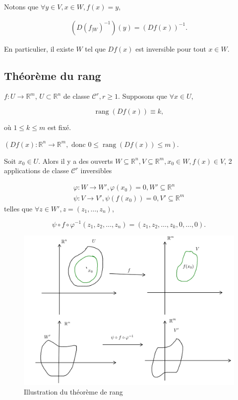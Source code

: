\documentclass[french]{article}
\begin{document}
Notons que $\forall y \in V, x \in W, f(x)=y$,

\begin{gather*}
  (D(f _{|W})^{-1} )(y) = (Df(x)) ^{-1}.
\end{gather*}

En particulier, il existe $W$ tel que $Df(x)$ est inversible pour tout $x \in W$.

\subsection{Théorème du rang}



\begin{thm}[Du rang]
  $f : U \to \mathbb{R}^m$, $U \subset \mathbb{R}^n$ de classe $\mathcal{C}^r, r \geq 1$.  Supposons que $\forall x \in U$,

  \[
  \operatorname{rang}(Df(x)) \equiv k,
  \]

  où $1 \leq k \leq m$ est fixé.

  $(Df(x) : \mathbb{R}^n \to \mathbb{R}^m, \text{ donc } 0 \leq \operatorname{rang}(Df(x)) \leq m)$.

  Soit $x_0 \in U$. Alors il y a des ouverts $W \subseteq \mathbb{R}^n, V \subseteq \mathbb{R}^m, x_0 \in W, f(x) \in V$, 2 applications de classe $\mathcal{C}^r$ inversibles

\[
\begin{matrix}
  \varphi : W \to W', \varphi(x_0) =0, W' \subseteq \mathbb{R}^n \\
  \psi : V \to V', \psi(f(x_0)) = 0, V' \subseteq \mathbb{R}^m
\end{matrix}
\]
 telles que $\forall z \in W', z=(z_1, \dots, z_n)$,

  \[
  \psi \circ f \circ \varphi ^{-1} (z_1,z_2, \dots, z_n) = (z_1, z_2, \dots, z_k, 0, \dots, 0).
  \]
\end{thm}

\begin{figure}[h!]
  \centering
  \includegraphics[scale=0.3]{figures/thm-rang.png}
  \caption{Illustration du théorème de rang}
  \label{}
\end{figure}
\end{document}
